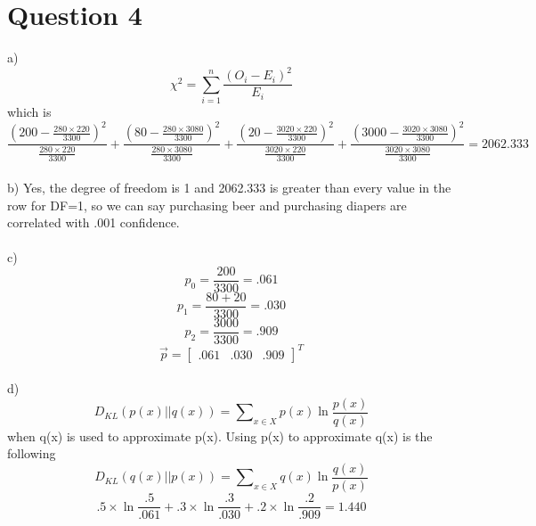 \documentclass{article}
\begin{document}
\section{Question 4}
a) $$\chi^2=\sum\limits_{i=1}^{n}{\frac{(O_i-E_i)^2}{E_i}}$$ which is $$\frac{(200-\frac{280\times220}{3300})^2}{\frac{280\times220}{3300}}+\frac{(80-\frac{280\times3080}{3300})^2}{\frac{280\times3080}{3300}}+\frac{(20-\frac{3020\times220}{3300})^2}{\frac{3020\times220}{3300}}+\frac{(3000-\frac{3020\times3080}{3300})^2}{\frac{3020\times3080}{3300}}=2062.333$$\\
b) Yes, the degree of freedom is 1 and 2062.333 is greater than every value in the row for DF=1, so we can say purchasing beer and purchasing diapers are correlated with .001 confidence.\\\\
c) $$p_0=\frac{200}{3300}=.061$$
$$p_1=\frac{80+20}{3300}=.030$$
$$p_2=\frac{3000}{3300}=.909$$
$$\vec{p} = \begin{bmatrix} .061 & .030 & .909 \end{bmatrix}^T$$\\
d) $$D_{KL}(p(x)||q(x))=\sum\nolimits_{x \in X}{p(x)\ln{\frac{p(x)}{q(x)}}}$$ when q(x) is used to approximate p(x).  Using p(x) to approximate q(x) is the following
$$D_{KL}(q(x)||p(x))=\sum\nolimits_{x \in X}{q(x)\ln{\frac{q(x)}{p(x)}}}$$
$$.5\times\ln{\frac{.5}{.061}}+.3\times\ln{\frac{.3}{.030}}+.2\times\ln{\frac{.2}{.909}}=1.440$$
\end{document}
